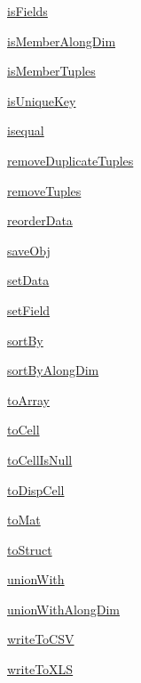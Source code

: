 \begin{list}{}{}
 \item \hyperref[method:smartdb.relations.ATypifiedStaticRelation.isFields]{isFields}
 \item \hyperref[method:smartdb.relations.ATypifiedStaticRelation.isMemberAlongDim]{isMemberAlongDim}
 \item \hyperref[method:smartdb.relations.ATypifiedStaticRelation.isMemberTuples]{isMemberTuples}
 \item \hyperref[method:smartdb.relations.ATypifiedStaticRelation.isUniqueKey]{isUniqueKey}
 \item \hyperref[method:smartdb.relations.ATypifiedStaticRelation.isequal]{isequal}
 \item \hyperref[method:smartdb.relations.ATypifiedStaticRelation.removeDuplicateTuples]{removeDuplicateTuples}
 \item \hyperref[method:smartdb.relations.ATypifiedStaticRelation.removeTuples]{removeTuples}
 \item \hyperref[method:smartdb.relations.ATypifiedStaticRelation.reorderData]{reorderData}
 \item \hyperref[method:smartdb.relations.ATypifiedStaticRelation.saveObj]{saveObj}
 \item \hyperref[method:smartdb.relations.ATypifiedStaticRelation.setData]{setData}
 \item \hyperref[method:smartdb.relations.ATypifiedStaticRelation.setField]{setField}
 \item \hyperref[method:smartdb.relations.ATypifiedStaticRelation.sortBy]{sortBy}
 \item \hyperref[method:smartdb.relations.ATypifiedStaticRelation.sortByAlongDim]{sortByAlongDim}
 \item \hyperref[method:smartdb.relations.ATypifiedStaticRelation.toArray]{toArray}
 \item \hyperref[method:smartdb.relations.ATypifiedStaticRelation.toCell]{toCell}
 \item \hyperref[method:smartdb.relations.ATypifiedStaticRelation.toCellIsNull]{toCellIsNull}
 \item \hyperref[method:smartdb.relations.ATypifiedStaticRelation.toDispCell]{toDispCell}
 \item \hyperref[method:smartdb.relations.ATypifiedStaticRelation.toMat]{toMat}
 \item \hyperref[method:smartdb.relations.ATypifiedStaticRelation.toStruct]{toStruct}
 \item \hyperref[method:smartdb.relations.ATypifiedStaticRelation.unionWith]{unionWith}
 \item \hyperref[method:smartdb.relations.ATypifiedStaticRelation.unionWithAlongDim]{unionWithAlongDim}
 \item \hyperref[method:smartdb.relations.ATypifiedStaticRelation.writeToCSV]{writeToCSV}
 \item \hyperref[method:smartdb.relations.ATypifiedStaticRelation.writeToXLS]{writeToXLS}
\end{list}
